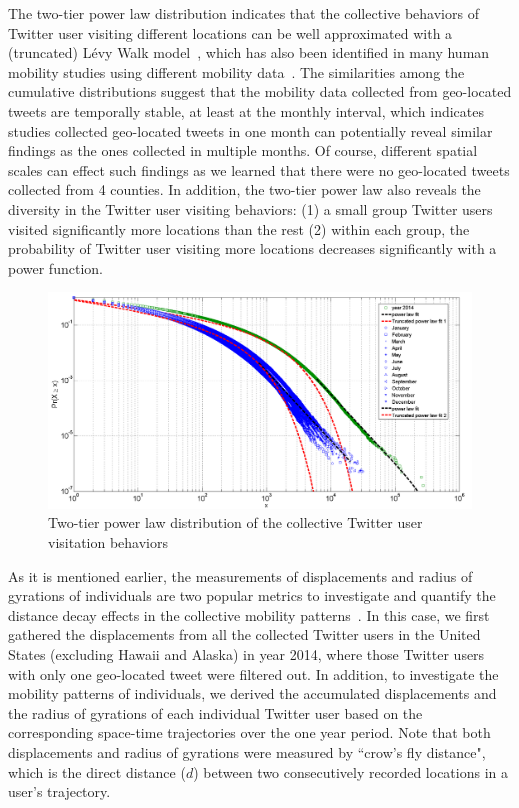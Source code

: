 \documentclass[ijgi,article,submit,moreauthors,pdftex,10pt,a4paper]{mdpi}
\theoremstyle{mdpi}
\newcounter{ex}
\newcounter{re}
\theoremstyle{mdpidefinition}
\begin{document}
The two-tier power law distribution indicates that the collective behaviors of Twitter user visiting different locations can be well approximated with a (truncated) L\'{e}vy Walk model~\cite{ reynolds2012truncated, rhee2011levy}, which has also been identified in many human mobility studies using different mobility data~\cite{zhao2015explaining}.
The similarities among the cumulative distributions suggest that the mobility data collected from geo-located tweets are temporally stable, at least at the monthly interval, which indicates studies collected geo-located tweets in one month can potentially reveal similar findings as the ones collected in multiple months. 
Of course, different spatial scales can effect such findings as we learned that there were no geo-located tweets collected from 4 counties.
In addition, the two-tier power law also reveals the diversity in the Twitter user visiting behaviors: (1) a small group Twitter users visited significantly more locations than the rest (2) within each group, the probability of Twitter user visiting more locations decreases significantly with a power function.

\begin{figure}[h]
\centering
\includegraphics[width=1.0\linewidth]{./figures/visitation2}
\caption{Two-tier power law distribution of the collective Twitter user visitation behaviors}
\label{fig:Arch}
\end{figure}
\FloatBarrier

As it is mentioned earlier, the measurements of displacements and radius of gyrations of individuals are two popular metrics to investigate and quantify the distance decay effects in the collective mobility patterns~\cite{gonzalez2008understanding}. In this case, we first gathered the displacements from all the collected Twitter users in the United States (excluding Hawaii and Alaska) in year 2014, where those Twitter users with only one geo-located tweet were filtered out. 
In addition, to investigate the mobility patterns of individuals, we derived the accumulated displacements and the radius of gyrations of each individual Twitter user based on the corresponding space-time trajectories over the one year period.
Note that both displacements and radius of gyrations were measured by ``crow's fly distance", which is the direct distance ($d$) between two consecutively recorded locations in a user's trajectory.
\end{document}
